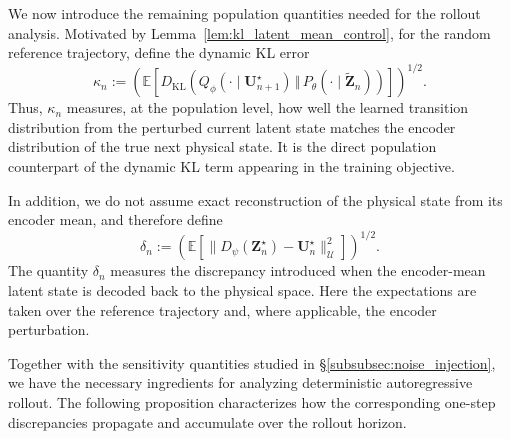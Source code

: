 \documentclass[11pt]{article}
\begin{document}
We now introduce the remaining population quantities needed for the rollout analysis. Motivated by Lemma~\ref{lem:kl_latent_mean_control}, for the random reference trajectory, define the dynamic KL error
\[
    \kappa_n
    :=
    \left(
        \mathbb E
        \left[
            D_{\mathrm{KL}}
            \left(
                Q_\phi(\cdot\mid\mathbf U_{n+1}^\star)
                \,\Vert\,
                P_\theta(\cdot\mid\widetilde{\mathbf Z}_n)
            \right)
        \right]
    \right)^{1/2}.
\]
Thus, $\kappa_n$ measures, at the population level, how well the learned transition distribution from the perturbed current latent state matches the encoder distribution of the true next physical state. It is the direct population counterpart of the dynamic KL term appearing in the training objective.

In addition, we do not assume exact reconstruction of the physical state from its encoder mean, and therefore define
\[
    \delta_n
    :=
    \left(
        \mathbb E
        \left[
            \|D_\psi(\mathbf Z_n^\star)-\mathbf U_n^\star\|_{\mathcal U}^2
        \right]
    \right)^{1/2}.
\]
The quantity $\delta_n$ measures the discrepancy introduced when the encoder-mean latent state is decoded back to the physical space. Here the expectations are taken over the reference trajectory and, where applicable, the encoder perturbation.

Together with the sensitivity quantities studied in \S\ref{subsubsec:noise_injection}, we have the necessary ingredients for analyzing deterministic autoregressive rollout. The following proposition characterizes how the corresponding one-step discrepancies propagate and accumulate over the rollout horizon.
\end{document}
